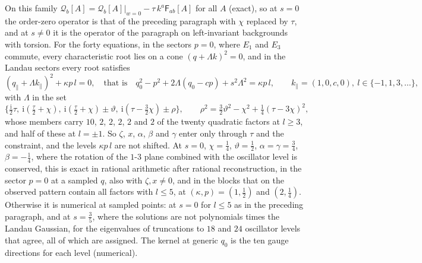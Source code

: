 On this family \(\mathcal Q_b[A]=\mathcal Q_b[A]|_{w=0}-\tau\,k^a\mathsf F_{ab}[A]\) for all \(A\) (exact), so at \(s=0\) the order-zero operator is that of the preceding paragraph with \(\chi\) replaced by \(\tau\), and at \(s\neq0\) it is the operator of the paragraph on left-invariant backgrounds with torsion. For the forty equations, in the sectors \(p=0\), where \(E_1\) and \(E_3\) commute, every characteristic root lies on a cone \((q+\Lambda k)^2=0\), and in the Landau sectors every root satisfies
\[
(q_\parallel+\Lambda k_\parallel)^2+\kappa p\,l=0,\quad\text{that is}\quad q_0^2-p^2+2\Lambda(q_0-cp)+s^2\Lambda^2=\kappa p\,l,\qquad k_\parallel=(1,0,c,0),\ l\in\{-1,1,3,\dots\},
\]
with \(\Lambda\) in the set
\[
\bigl\{\tfrac{\mathrm i}2\tau,\ \mathrm i(\tfrac\tau2+\chi),\ \mathrm i(\tfrac\tau2+\chi)\pm\vartheta,\ \mathrm i(\tau-\tfrac32\chi)\pm\rho\bigr\},\qquad\rho^2=\tfrac32\vartheta^2-\chi^2+\tfrac14(\tau-3\chi)^2,
\]
whose members carry \(10\), \(2\), \(2\), \(2\), \(2\) and \(2\) of the twenty quadratic factors at \(l\ge3\), and half of these at \(l=\pm1\). So \(\zeta\), \(x\), \(\alpha\), \(\beta\) and \(\gamma\) enter only through \(\tau\) and the constraint, and the levels \(\kappa p\,l\) are not shifted. At \(s=0\), \(\chi=\tfrac14\), \(\vartheta=\tfrac12\), \(\alpha=\gamma=\tfrac34\), \(\beta=-\tfrac14\), where the rotation of the \(1\)-\(3\) plane combined with the oscillator level is conserved, this is exact in rational arithmetic after rational reconstruction, in the sector \(p=0\) at a sampled \(q\), also with \(\zeta,x\neq0\), and in the blocks that on the observed pattern contain all factors with \(l\le5\), at \((\kappa,p)=(1,\tfrac12)\) and \((2,\tfrac14)\). Otherwise it is numerical at sampled points: at \(s=0\) for \(l\le5\) as in the preceding paragraph, and at \(s=\tfrac35\), where the solutions are not polynomials times the Landau Gaussian, for the eigenvalues of truncations to \(18\) and \(24\) oscillator levels that agree, all of which are assigned. The kernel at generic \(q_0\) is the ten gauge directions for each level (numerical).

